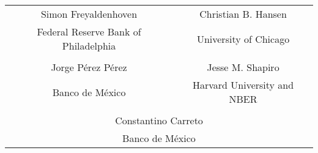 \documentclass[12pt]{article}
\begin{document}
\begin{table}[h]
		\centering
	\begin{tabular}{cc}
		Simon Freyaldenhoven & Christian B. Hansen \\
		Federal Reserve Bank of Philadelphia & University of Chicago \\
		\\
		Jorge P\'erez P\'erez & Jesse M. Shapiro \\
		Banco de México & Harvard University and NBER \\
		\\
		\multicolumn{2}{c}{Constantino Carreto} \\
		\multicolumn{2}{c}{Banco de México} \\
	\end{tabular}
\end{table}





\end{document}
